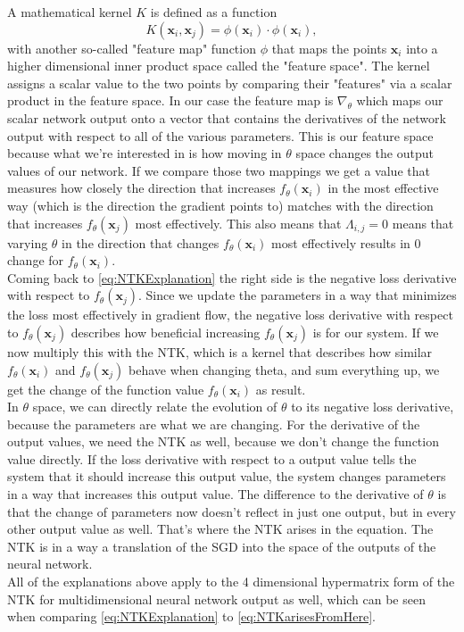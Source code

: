 A mathematical kernel $K$ is defined as a function
\begin{equation}
	K(\mathbf{x}_i, \mathbf{x}_j) = \phi(\mathbf{x}_i)\cdot\phi(\mathbf{x}_i),
\end{equation}
with another so-called "feature map" function $\phi$ that maps the points $\mathbf{x}_i$ into a higher dimensional inner product space called the "feature space". The kernel assigns a scalar value to the two points by comparing their "features" via a scalar product in the feature space. In our case the feature map is $\nabla_\theta$ which maps our scalar network output onto a vector that contains the derivatives of the network output with respect to all of the various parameters. This is our feature space because what we're interested in is how moving in $\theta$ space changes the output values of our network. If we compare those two mappings we get a value that measures how closely the direction that increases $f_\theta(\mathbf{x}_i)$ in the most effective way (which is the direction the gradient points to) matches with the direction that increases $f_\theta(\mathbf{x}_j)$ most effectively. This also means that $\Lambda_{i,j}=0$ means that varying $\theta$ in the direction that changes $f_\theta(\mathbf{x}_i)$ most effectively results in 0 change for $f_\theta(\mathbf{x}_i)$.\\
Coming back to \cref{eq:NTKExplanation} the right side is the negative loss derivative with respect to $f_\theta(\mathbf{x}_j)$. Since we update the parameters in a way that minimizes the loss most effectively in gradient flow, the negative loss derivative with respect to $f_\theta(\mathbf{x}_j)$ describes how beneficial increasing $f_\theta(\mathbf{x}_j)$ is for our system. If we now multiply this with the NTK, which is a kernel that describes how similar $f_\theta(\mathbf{x}_i)$ and $f_\theta(\mathbf{x}_j)$ behave when changing theta, and sum everything up, we get the change of the function value $f_\theta(\mathbf{x}_i)$ as result.\\
In $\theta$ space, we can directly relate the evolution of $\theta$ to its negative loss derivative, because the parameters are what we are changing. For the derivative of the output values, we need the NTK as well, because we don't change the function value directly. If the loss derivative with respect to a output value tells the system that it should increase this output value, the system changes parameters in a way that increases this output value. The difference to the derivative of $\theta$ is that the change of parameters now doesn't reflect in just one output, but in every other output value as well. That's where the NTK arises in the equation. The NTK is in a way a translation of the SGD into the space of the outputs of the neural network.\\
All of the explanations above apply to the 4 dimensional hypermatrix form of the NTK for multidimensional neural network output as well, which can be seen when comparing \cref{eq:NTKExplanation} to \cref{eq:NTKarisesFromHere}.